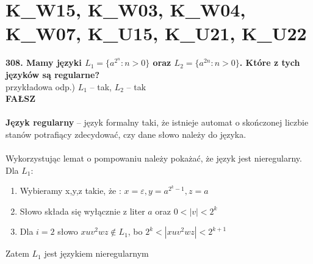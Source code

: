 \section{K\_W15, K\_W03, K\_W04, K\_W07, K\_U15, K\_U21, K\_U22}
\textbf{308. Mamy języki $L_1 = \{ a^{2^n} : n > 0\}$ oraz $L_2 = \{ a^{2n} : n > 0\}$. Które z tych języków są regularne? }\\
przykładowa odp.) $L_1$ -- tak, $L_2$ -- tak\\
\textbf{FAŁSZ}\\\\

\textbf{Język regularny} -- język formalny taki, że istnieje automat o skończonej liczbie stanów potrafiący zdecydować, czy dane słowo należy do języka.\\\\

Wykorzystując lemat o pompowaniu należy pokażać, że język jest nieregularny. Dla $L_1$:\\
\begin{enumerate}
	\item Wybieramy x,y,z takie, że : $x=\varepsilon, y=a^{2^{k}-1}, z=a$
	\item Słowo składa się wyłącznie z liter $a$ oraz $0<|v|<2^k$
	\item Dla $i=2$ słowo $xuv^2wz \notin L_1 $, bo $2^k < |xuv^2wz| < 2^{k+1}$
\end{enumerate}
Zatem $L_1$ jest językiem nieregularnym
